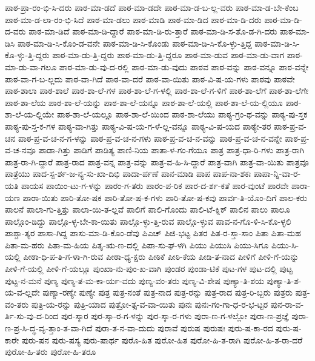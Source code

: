 {ಪಾಠ-ಪ್ರಾ-ರಂ-ಭಿ-ಸಿ-ದರು
ಪಾಠ-ಮಾ-ಡದೆ
ಪಾಠ-ಮಾ-ಡದೇ
ಪಾಠ-ಮಾ-ಡ-ಬ-ಲ್ಲ-ವರು
ಪಾಠ-ಮಾ-ಡ-ಬೇ-ಕೆಂಬ
ಪಾಠ-ಮಾ-ಡ-ಲಾ-ರಂ-ಭಿ-ಸಿದೆ
ಪಾಠ-ಮಾ-ಡಲು
ಪಾಠ-ಮಾಡಿ
ಪಾಠ-ಮಾ-ಡಿದ
ಪಾಠ-ಮಾ-ಡಿ-ದರು
ಪಾಠ-ಮಾ-ಡಿ-ದ-ವರು
ಪಾಠ-ಮಾ-ಡಿದೆ
ಪಾಠ-ಮಾ-ಡಿ-ದ್ದಾರೆ
ಪಾಠ-ಮಾ-ಡಿ-ರು-ತ್ತಾರೆ
ಪಾಠ-ಮಾ-ಡಿ-ಸ-ತೊ-ಡ-ಗಿ-ದರು
ಪಾಠ-ಮಾ-ಡಿಸಿ
ಪಾಠ-ಮಾ-ಡಿ-ಸಿ-ಕೊಂ-ಡ-ವನೇ
ಪಾಠ-ಮಾ-ಡಿ-ಸಿ-ಕೊಂಡು
ಪಾಠ-ಮಾ-ಡಿ-ಸಿ-ಕೊ-ಳ್ಳು-ತ್ತಿದ್ದ
ಪಾಠ-ಮಾ-ಡಿ-ಸಿ-ಕೊ-ಳ್ಳು-ತ್ತಿ-ದ್ದರು
ಪಾಠ-ಮಾ-ಡು-ತ್ತಿ-ದ್ದರು
ಪಾಠ-ಮಾ-ಡು-ತ್ತಿ-ದ್ದರೂ
ಪಾಠ-ಮಾ-ಡುವ
ಪಾಠ-ಮಾ-ಡು-ವಾಗ
ಪಾಠ-ಮಾ-ಡು-ವಾ-ಗಲೂ
ಪಾಠ-ಮಾ-ಡು-ವು-ದ-ರಲ್ಲಿ
ಪಾಠ-ಮಾ-ಡು-ವುದು
ಪಾಠವ
ಪಾಠ-ವನ್ನು
ಪಾಠ-ವನ್ನೂ
ಪಾಠ-ವನ್ನೇ
ಪಾಠ-ವಾ-ಗ-ಬ-ಲ್ಲದು
ಪಾಠ-ವಾ-ಗಿದೆ
ಪಾಠ-ವಾ-ದರೆ
ಪಾಠ-ವಾ-ಯಿತು
ಪಾಠ-ವಿ-ಷ-ಯ-ಗಳು
ಪಾಠವು
ಪಾಠವೇ
ಪಾಠ-ಶಾಲಾ
ಪಾಠ-ಶಾಲೆ
ಪಾಠ-ಶಾ-ಲೆ-ಗಳ
ಪಾಠ-ಶಾ-ಲೆ-ಗ-ಳಲ್ಲಿ
ಪಾಠ-ಶಾ-ಲೆ-ಗ-ಳಿಗೆ
ಪಾಠ-ಶಾ-ಲೆಗೆ
ಪಾಠ-ಶಾ-ಲೆಗೇ
ಪಾಠ-ಶಾ-ಲೆಯ
ಪಾಠ-ಶಾ-ಲೆ-ಯನ್ನು
ಪಾಠ-ಶಾ-ಲೆ-ಯನ್ನೂ
ಪಾಠ-ಶಾ-ಲೆ-ಯಲ್ಲಿ
ಪಾಠ-ಶಾ-ಲೆ-ಯ-ಲ್ಲಿಯೂ
ಪಾಠ-ಶಾ-ಲೆ-ಯ-ಲ್ಲಿಯೇ
ಪಾಠ-ಶಾ-ಲೆ-ಯಲ್ಲೂ
ಪಾಠ-ಶಾ-ಲೆ-ಯಿಂದ
ಪಾಠ-ಶಾ-ಲೆಯು
ಪಾಠ್ಯ-ಗ್ರಂ-ಥ-ವನ್ನು
ಪಾಠ್ಯ-ಪು-ಸ್ತಕ
ಪಾಠ್ಯ-ಪು-ಸ್ತ-ಕ-ಗಳ
ಪಾಠ್ಯ-ವಾ-ಗಿತ್ತು
ಪಾಠ್ಯ-ವಿ-ಷ-ಯ-ಗ-ಳೆ-ಲ್ಲ-ವನ್ನೂ
ಪಾಠ್ಯ-ವಿ-ಷ-ಯದ
ಪಾಠ್ಯೇ-ತರ
ಪಾಠ-ಪ್ರ-ವ-ಚನ
ಪಾಠ-ಪ್ರ-ವ-ಚ-ನ-ಗ-ಳನ್ನು
ಪಾಠ-ಪ್ರ-ವ-ಚ-ನ-ಗಳು
ಪಾಠ-ಪ್ರ-ವ-ಚ-ನ-ವನ್ನು
ಪಾಠ-ಪ್ರ-ವ-ಚ-ನ-ವನ್ನೇ
ಪಾಠ-ಪ್ರ-ವ-ಚ-ನವೂ
ಪಾಡಾ-ಗಿತ್ತು
ಪಾಡಿಗೆ
ಪಾಡಿತ್ಯ
ಪಾಣಿ-ನಿಯ
ಪಾತಾ-ಳ-ಗಂ-ಗೆಯೂ
ಪಾತ್ರ
ಪಾತ್ರ-ಧಾ-ರಿ-ಗಳು
ಪಾತ್ರ-ರಾಗಿ
ಪಾತ್ರ-ರಾ-ಗಿ-ದ್ದಾರೆ
ಪಾತ್ರ-ರಾದ
ಪಾತ್ರ-ವನ್ನ
ಪಾತ್ರ-ವನ್ನು
ಪಾತ್ರ-ವ-ಹಿ-ಸಿ-ದ್ದಾರೆ
ಪಾತ್ರ-ವಾಗಿ
ಪಾತ್ರ-ವಾ-ಯಿತು
ಪಾತ್ರವೂ
ಪಾತ್ರೆಯು
ಪಾದ-ಸ್ಪ-ರ್ಶ-ಜ-ನ್ಯ-ಸು-ಖಾ-ದಿಭಿ
ಪಾದಾ-ರ್ಪಣೆ
ಪಾನ-ಮಾಡಿ
ಪಾಪ
ಪಾಪ-ನಾ-ಶಕಃ
ಪಾಪಾ-ನ್ನಿ-ವಾ-ರ-ಯತಿ
ಪಾಯಸ
ಪಾಯಿಂ-ಟು-ಗ-ಳನ್ನು
ಪಾರಂ-ಗ-ತರು
ಪಾರಂ-ಪ-ರಿಕ
ಪಾರ-ದ-ರ್ಶ-ಕತೆ
ಪಾರ-ವುಂಟೆ
ಪಾರವೇ
ಪಾರಾ-ಯಣ
ಪಾರಾ-ಯಿತು
ಪಾರಿ-ತೋ-ಷಕ
ಪಾರಿ-ತೋ-ಷ-ಕ-ಗಳು
ಪಾರಿ-ತೋ-ಷ-ಕವು
ಪಾರ್ವ-ತಿ-ಯೊಂ-ದಿಗೆ
ಪಾಲ-ಕರು
ಪಾಲನೆ
ಪಾಲಾ-ಗು-ತ್ತಿತ್ತು
ಪಾಲಾ-ಯಿ-ತ-ಲ್ಲವೆ
ಪಾಲಿಗೆ
ಪಾಲಿ-ಗೊಂದು
ಪಾಲಿ-ಟೆ-ಕ್ನಿಕ್
ಪಾಲಿನ
ಪಾಲು
ಪಾಲೂ
ಪಾಲ್ಗೊಂ-ಡಿದ್ದು
ಪಾಲ್ಗೊ-ಳ್ಳ-ಬೇ-ಕಾ-ಯಿತು
ಪಾಲ್ಗೊ-ಳ್ಳು-ತ್ತಿ-ರುವ
ಪಾಲ್ಗೊ-ಳ್ಳುವ
ಪಾವ-ನ-ಗೊ-ಳಿ-ಸಿ-ಕೊ-ಳ್ಳಲಿ
ಪಾಶ್ಚಾ-ತ್ಯರ
ಪಾಸಾ-ಗಿದ್ದ
ಪಾಸು-ಮಾ-ಡಿ-ಕೊಂ-ಡೆವು
ಪಿಎಚ್
ಪಿಜಿ-ಭಟ್ಟ
ಪಿತರ
ಪಿತ-ರ-ಸ್ತಾ-ಸಾಂ
ಪಿತಾ
ಪಿತಾ-ಮಹ
ಪಿತಾ-ಮ-ಹರು
ಪಿತಾ-ಮ-ಹಿಯ
ಪಿತೃ-ಋ-ಣ-ದಲ್ಲಿ
ಪಿಪಾ-ಸು-ಘ-ಳಗಿ
ಪಿಯು
ಪಿಯುಸಿ
ಪಿಯು-ಸಿಗೂ
ಪಿಯು-ಸಿ-ಯಲ್ಲಿ
ಪೀಠಾ-ಧಿ-ಪ-ತಿ-ಗ-ಳಾ-ಗಿ-ರುವ
ಪೀಠಾ-ಧ್ಯ-ಕ್ಷರು
ಪೀಠಿಕೆ
ಪೀಠಿ-ಕೆಯ
ಪೀಡಿ-ತ-ನಾದ
ಪೀಳಿಗೆ
ಪೀಳಿ-ಗೆ-ಯನ್ನು
ಪೀಳಿ-ಗೆ-ಯಲ್ಲಿ
ಪೀಳಿ-ಗೆ-ಯಲ್ಲೂ
ಪುಂಖಾ-ನು-ಪುಂ-ಖ-ವಾಗಿ
ಪುಂಡರ
ಪುಂಡಾ-ಟಿಕೆ
ಪುಟ-ಗಳ
ಪುಟ-ದಲ್ಲಿ
ಪುಟ್ಟ
ಪುಟ್ಟ-ನ-ಮನೆ
ಪುಣ್ಯ
ಪುಣ್ಯ-ತ-ಮ-ಕಾ-ರ್ಯ-ವದು
ಪುಣ್ಯ-ವಂ-ತರು
ಪುಣ್ಯ-ವಿ-ಶೇಷ
ಪುಣ್ಯಾ-ತಿ-ಶಯ
ಪುಣ್ಯಾ-ತಿ-ಶ-ಯ-ವ-ಲ್ಲದೇ
ಪುಣ್ಯಾ-ರಣ್ಯೇ
ಪುಣ್ಯೇ
ಪುತ್ರ
ಪುತ್ರ-ನಂತೆ
ಪುತ್ರ-ನಾದ
ಪುತ್ರ-ರನ್ನು
ಪುತ್ರ-ರಾದ
ಪುತ್ರ-ರಿ-ಬ್ಬರು
ಪುತ್ರರು
ಪುತ್ರ-ವಂ-ತರು
ಪುತ್ರಿ-ಯ-ರನ್ನು
ಪುತ್ರಿ-ಯಾದ
ಪುತ್ರೋ-ತ್ಸ-ವ-ವಾ-ಯಿತು
ಪುನಃ
ಪುನಃ-ಗಂ-ಗಾ-ಧ-ರ-ಭ-ಟ್ಟರ
ಪುನ-ರಾ-ವ-ರ್ತಿ-ಸು-ವು-ದ-ರಿಂದ
ಪುರ-ಸ್ಕಾರ
ಪುರ-ಸ್ಕಾ-ರ-ಗ-ಳನ್ನು
ಪುರ-ಸ್ಕಾ-ರ-ಗಳು
ಪುರಾ-ಣ-ಗ-ಳಲ್ಲೋ
ಪುರಾ-ಣ-ಪ್ರಜ್ಞೆ
ಪುರಾ-ಣ-ಪ್ರ-ಸಿ-ದ್ಧ-ವೃ-ತ್ತಾಂ-ತ-ವಾ-ಗಿದೆ
ಪುರಾ-ತ-ನ-ವಾ-ದುದು
ಪುರಾವೆ
ಪುರುಷ
ಪುರುಷಃ
ಪುರು-ಷ-ಕಾ-ರದ
ಪುರು-ಷ-ಕಾರೇ
ಪುರು-ಷನ
ಪುರು-ಷಸ್ಯ
ಪುರು-ಷಾರ್ಥ
ಪುರೊ-ಹಿತ
ಪುರೋ-ಹಿತ
ಪುರೋ-ಹಿ-ತ-ರಾಗಿ
ಪುರೋ-ಹಿ-ತ-ರಾ-ದರೆ
ಪುರೋ-ಹಿ-ತರು
ಪುರೋ-ಹಿ-ತರೂ
}
